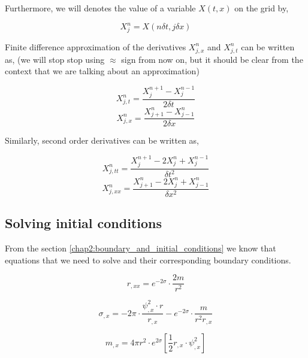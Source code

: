 Furthermore, we will denotes the value of a variable $X(t,x)$ on the grid by,

\begin{equation}
    X^{n}_{j}  = X(n \delta t, j \delta x)
\end{equation}

Finite difference approximation of the derivatives $X^n_{j,x}$ and $X^n_{j,t}$ can be written as, (we will stop stop using $\approx$ sign from now on, but it should be clear from the context that we are talking about an approximation)

\begin{equation}
    X^n_{j,t} = \frac{X^{n+1}_{j} - X^{n-1}_{j}}{2 \delta t}
\end{equation}
\begin{equation}
    X^n_{j,x} = \frac{X^n_{j+1} - X^n_{j-1}}{2 \delta x}
\end{equation}

Similarly, second order derivatives can be written as,


\begin{equation}
    X^n_{j,tt} = \frac{X^{n+1}_{j} -2X^n_j + X^{n-1}_{j}}{\delta t^2}
\end{equation}
\begin{equation}
    X^n_{j,xx} = \frac{X^n_{j+1} -2 X^n_j+ X^n_{j-1}}{\delta x^2}
\end{equation}




\subsection{Solving initial conditions}

From the section \ref{chap2:boundary_and_initial_conditions} we know that equations that we need to solve and their corresponding boundary conditions.


\begin{equation}
    r_{, x x}=e^{-2 \sigma} \cdot \frac{2 m}{r^{2}}
    \label{eqn:r_ic}
\end{equation}


\begin{equation}
    \sigma_{, x}= -2 \pi \cdot  \frac{\psi_{, x}^{2} \cdot r}{r_{,x}}- e^{-2 \sigma} \cdot \frac{ m}{r^{2}r_{, x}}
    \label{eqn:sigma_ic}
\end{equation}

\begin{equation}
    m_{, x}=4 \pi r^{2} \cdot e^{2 \sigma}\left[\frac{1}{2} r_{, x} \cdot \psi_{, x}^{2} \right]
    \label{eqn:m_ic}
\end{equation}


